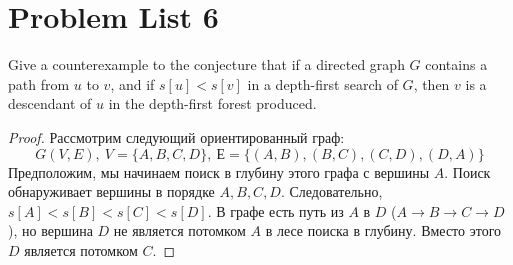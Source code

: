 \section{Problem List 6}

\begin{prob}
Give a counterexample to the conjecture that if a directed graph $G$ contains a path from $u$ to $v$, and if $s[u]<s[v]$ in a depth-first search of $G$, then $v$ is a descendant of $u$ in the depth-first forest produced.
\end{prob}
\vskip 0.2in
\begin{proof}
Рассмотрим следующий ориентированный граф:
$$
G(V,E),\ V = \{ A,B,C,D \},\ Е = \{(A, B), (B, C), (C, D), (D, A) \}
$$
Предположим, мы начинаем поиск в глубину этого графа с вершины $A$. Поиск обнаруживает вершины в порядке $A,B,C,D$. Следовательно, $s[A]<s[B]<s[C]<s[D]$.
\vskip 0.1in
В графе есть путь из $A$ в $D$ ($A\to B \to C \to D$), но вершина $D$ не является потомком $A$ в лесе поиска в глубину. Вместо этого $D$ является потомком $C$.
\end{proof}
\vskip 0.6in

\begin{comment}

\end{comment}



